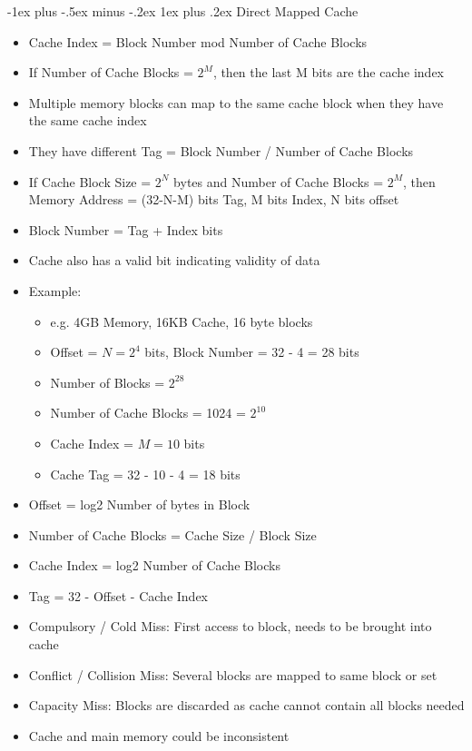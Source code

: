 \documentclass[10pt, portrait]{article}
\makeatletter
\renewcommand{\subsection}{\@startsection{subsection}{3}{0mm}%
                                {-1ex plus -.5ex minus -.2ex}%
                                {1ex plus .2ex}%
                                {\normalfont\small\bfseries}}%
\makeatother
\begin{document}
\begin{multicols*}{2}
\subsection{Direct Mapped Cache}
\begin{itemize}
    \item Cache Index = Block Number mod Number of Cache Blocks
    \item If Number of Cache Blocks = $2^M$, then the last M bits are the cache index
    \item Multiple memory blocks can map to the same cache block when they have the same cache index
    \item They have different Tag = Block Number / Number of Cache Blocks
    \item If Cache Block Size = $2^N$ bytes and Number of Cache Blocks = $2^M$, then Memory Address = (32-N-M) bits Tag, M bits Index, N bits offset
    \item Block Number = Tag + Index bits
    \item Cache also has a valid bit indicating validity of data
    \item Example:
    \begin{itemize}
        \item e.g. 4GB Memory, 16KB Cache, 16 byte blocks
        \item Offset = $N = 2^4$ bits, Block Number = 32 - 4 = 28 bits
        \item Number of Blocks = $2^{28}$
        \item Number of Cache Blocks = 1024 = $2^{10}$
        \item Cache Index = $M = 10$ bits
        \item Cache Tag = 32 - 10 - 4 = 18 bits
    \end{itemize}
    \item Offset = log2 Number of bytes in Block
    \item Number of Cache Blocks = Cache Size / Block Size
    \item Cache Index = log2 Number of Cache Blocks
    \item Tag = 32 - Offset - Cache Index
    \item Compulsory / Cold Miss: First access to block, needs to be brought into cache
    \item Conflict / Collision Miss: Several blocks are mapped to same block or set
    \item Capacity Miss: Blocks are discarded as cache cannot contain all blocks needed
    \item Cache and main memory could be inconsistent

\end{itemize}
\end{multicols*}
\end{document}
